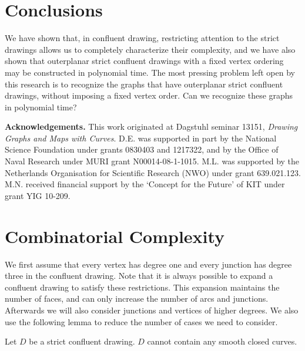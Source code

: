 \documentclass{llncs}
\renewcommand{\paragraph}[1]{\medskip\noindent\textbf{#1.}}
\begin{document}
\section {Conclusions}

We have shown that, in confluent drawing, restricting attention to the strict drawings allows us to completely characterize their complexity, and we have also shown that outerplanar strict confluent drawings with a fixed vertex ordering may be constructed in polynomial time. The most pressing problem left open by this research is to recognize the graphs that have outerplanar strict confluent drawings, without imposing a fixed vertex order. Can we recognize these graphs in polynomial time?

\medskip
\paragraph{Acknowledgements}
This work originated at Dagstuhl seminar 13151, \emph {Drawing Graphs and Maps with Curves}. D.E. was supported in part by the National Science Foundation under grants 0830403 and 1217322, and by the Office of Naval Research under MURI grant N00014-08-1-1015. M.L. was supported by the Netherlands Organisation for Scientific Research (NWO) under grant 639.021.123. M.N. received financial support by the `Concept for the Future' of KIT under grant YIG 10-209.

\small


\normalsize
\appendix\clearpage


\section{Combinatorial Complexity} \label {app:complexity}

We first assume that every vertex has degree one and every junction has degree three in the confluent drawing. Note that it is always possible to expand a confluent drawing to satisfy these restrictions. This expansion maintains the number of faces, and can only increase the number of arcs and junctions. Afterwards we will also consider junctions and vertices of higher degrees.
We also use the following lemma to reduce the number of cases we need to consider.

\begin {lemma} \label {lem:noloops}
  Let $D$ be a strict confluent drawing. $D$ cannot contain any smooth closed curves.
\end {lemma}
\end{document}
